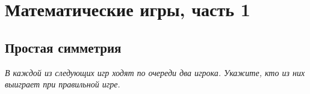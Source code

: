 

\section*{Математические игры, часть 1}



\subsection*{Простая симметрия}

\emph{%
В каждой из следующих игр ходят по очереди два игрока.
Укажите, кто из них выиграет при правильной игре.}

